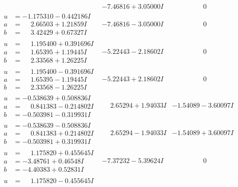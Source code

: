 \documentclass[1p]{elsarticle_modified}
\theoremstyle{definition}
\begin{document}
$$\begin{array}{c|c|c}
 & -7.46816 + 3.05000 I & \phantom{-0.000000 } 0 \\ \hline\begin{aligned}
u &= -1.175310 - 0.442186 I \\
a &= \phantom{-}2.66503 + 1.21859 I \\
b &= \phantom{-}3.42429 + 0.67327 I\end{aligned}
 & -7.46816 - 3.05000 I & \phantom{-0.000000 } 0 \\ \hline\begin{aligned}
u &= \phantom{-}1.195400 + 0.391696 I \\
a &= \phantom{-}1.65395 + 1.19445 I \\
b &= \phantom{-}2.33568 + 1.26225 I\end{aligned}
 & -5.22443 - 2.18602 I & \phantom{-0.000000 } 0 \\ \hline\begin{aligned}
u &= \phantom{-}1.195400 - 0.391696 I \\
a &= \phantom{-}1.65395 - 1.19445 I \\
b &= \phantom{-}2.33568 - 1.26225 I\end{aligned}
 & -5.22443 + 2.18602 I & \phantom{-0.000000 } 0 \\ \hline\begin{aligned}
u &= -0.538639 + 0.508836 I \\
a &= \phantom{-}0.841383 - 0.214802 I \\
b &= -0.503981 - 0.319931 I\end{aligned}
 & \phantom{-}2.65294 + 1.94033 I & -1.54089 - 3.60097 I \\ \hline\begin{aligned}
u &= -0.538639 - 0.508836 I \\
a &= \phantom{-}0.841383 + 0.214802 I \\
b &= -0.503981 + 0.319931 I\end{aligned}
 & \phantom{-}2.65294 - 1.94033 I & -1.54089 + 3.60097 I \\ \hline\begin{aligned}
u &= \phantom{-}1.175820 + 0.455645 I \\
a &= -3.48761 + 0.46548 I \\
b &= -4.40383 + 0.52831 I\end{aligned}
 & -7.37232 - 5.39624 I & \phantom{-0.000000 } 0 \\ \hline\begin{aligned}
u &= \phantom{-}1.175820 - 0.455645 I \\

\end{aligned}
\end{array}$$
\end{document}
